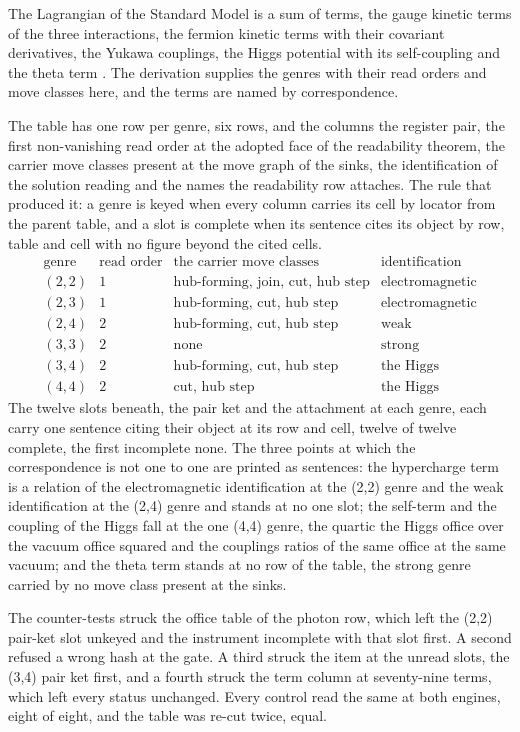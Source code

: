 \begin{chbridge}
The Lagrangian of the Standard Model is a sum of terms, the gauge kinetic terms of the three interactions, the fermion kinetic terms with their covariant derivatives, the Yukawa couplings, the Higgs potential with its self-coupling and the theta term \cite{Glashow1961,Weinberg1967}. The derivation supplies the genres with their read orders and move classes here, and the terms are named by correspondence.
\end{chbridge}
\begin{chproof}[instrument]
The table has one row per genre, six rows, and the columns the register pair, the first non-vanishing read order at the adopted face of the readability theorem, the carrier move classes present at the move graph of the sinks, the identification of the solution reading and the names the readability row attaches. The rule that produced it: a genre is keyed when every column carries its cell by locator from the parent table, and a slot is complete when its sentence cites its object by row, table and cell with no figure beyond the cited cells.
\begin{equation}
\begin{array}{llll}
\text{genre} & \text{read order} & \text{the carrier move classes} & \text{identification}\\
(2,2) & 1 & \text{hub-forming, join, cut, hub step} & \text{electromagnetic}\\
(2,3) & 1 & \text{hub-forming, cut, hub step} & \text{electromagnetic}\\
(2,4) & 2 & \text{hub-forming, cut, hub step} & \text{weak}\\
(3,3) & 2 & \text{none} & \text{strong}\\
(3,4) & 2 & \text{hub-forming, cut, hub step} & \text{the Higgs}\\
(4,4) & 2 & \text{cut, hub step} & \text{the Higgs}
\end{array}
\end{equation}
The twelve slots beneath, the pair ket and the attachment at each genre, each carry one sentence citing their object at its row and cell, twelve of twelve complete, the first incomplete none. The three points at which the correspondence is not one to one are printed as sentences: the hypercharge term is a relation of the electromagnetic identification at the (2,2) genre and the weak identification at the (2,4) genre and stands at no one slot; the self-term and the coupling of the Higgs fall at the one (4,4) genre, the quartic the Higgs office over the vacuum office squared and the couplings ratios of the same office at the same vacuum; and the theta term stands at no row of the table, the strong genre carried by no move class present at the sinks.

The counter-tests struck the office table of the photon row, which left the (2,2) pair-ket slot unkeyed and the instrument incomplete with that slot first. A second refused a wrong hash at the gate. A third struck the item at the unread slots, the (3,4) pair ket first, and a fourth struck the term column at seventy-nine terms, which left every status unchanged. Every control read the same at both engines, eight of eight, and the table was re-cut twice, equal.
\end{chproof}
